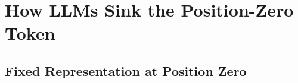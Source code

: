 \documentclass[]{template}
\theoremstyle{plain}
\theoremstyle{definition}
\theoremstyle{remark}
\begin{document}






\section{How LLMs Sink the Position-Zero Token}


\subsection{Fixed Representation at Position Zero}
\end{document}
